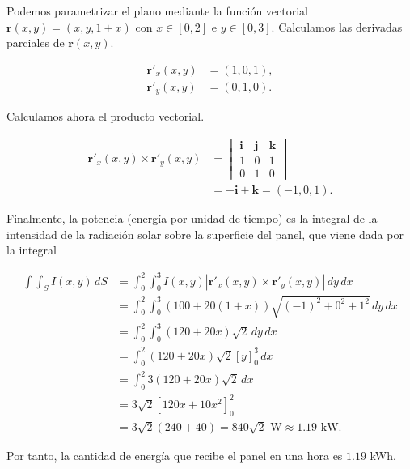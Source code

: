 \documentclass[
  spanish,
  a4paper,
]{scrreport}
\theoremstyle{definition}
\theoremstyle{remark}
\begin{document}
\begin{tcolorbox}[enhanced jigsaw, arc=.35mm, bottomrule=.15mm, bottomtitle=1mm, breakable, colback=white, colbacktitle=quarto-callout-tip-color!10!white, colframe=quarto-callout-tip-color-frame, coltitle=black, left=2mm, leftrule=.75mm, opacityback=0, opacitybacktitle=0.6, rightrule=.15mm, title=\textcolor{quarto-callout-tip-color}{\faLightbulb}\hspace{0.5em}{Solución}, titlerule=0mm, toprule=.15mm, toptitle=1mm]

Podemos parametrizar el plano mediante la función vectorial
\(\mathbf{r}(x,y) = (x, y, 1+x)\) con \(x\in[0,2]\) e \(y\in[0,3]\).
Calculamos las derivadas parciales de \(\mathbf{r}(x,y)\).

\begin{align*}
\mathbf{r}'_x(x,y) &= (1, 0, 1), \\
\mathbf{r}'_y(x,y) &= (0, 1, 0).
\end{align*}

Calculamos ahora el producto vectorial.

\begin{align*}
\mathbf{r}'_x(x,y) \times \mathbf{r}'_y(x,y)
&= \begin{vmatrix}
\mathbf{i} & \mathbf{j} & \mathbf{k} \\
1 & 0 & 1 \\
0 & 1 & 0
\end{vmatrix} \\
&= -\mathbf{i} + \mathbf{k}
= (-1, 0, 1).
\end{align*}

Finalmente, la potencia (energía por unidad de tiempo) es la integral de
la intensidad de la radiación solar sobre la superficie del panel, que
viene dada por la integral

\begin{align*}
\int\int_S I(x,y)\,dS
&= \int_0^2 \int_0^3 I(x,y) |\mathbf{r}'_x(x,y) \times \mathbf{r}'_y(x,y)|\,dy\,dx \\
&= \int_0^2 \int_0^3 (100 + 20(1+x)) \sqrt{(-1)^2 + 0^2 + 1^2}\,dy\,dx \\
&= \int_0^2 \int_0^3 (120 + 20x) \sqrt{2}\,dy\,dx \\
&= \int_0^2 (120 + 20x) \sqrt{2} [y]_0^3\,dx \\
&= \int_0^2 3(120 + 20x) \sqrt{2}\,dx \\
&= 3\sqrt{2} \left[120x + 10x^2\right]_0^2 \\
&= 3\sqrt{2} (240 + 40) 
= 840\sqrt{2} \mbox{ W}
\approx 1.19 \mbox{ kW}.
\end{align*}

Por tanto, la cantidad de energía que recibe el panel en una hora es
\(1.19\) kWh.

\end{tcolorbox}
\end{document}
